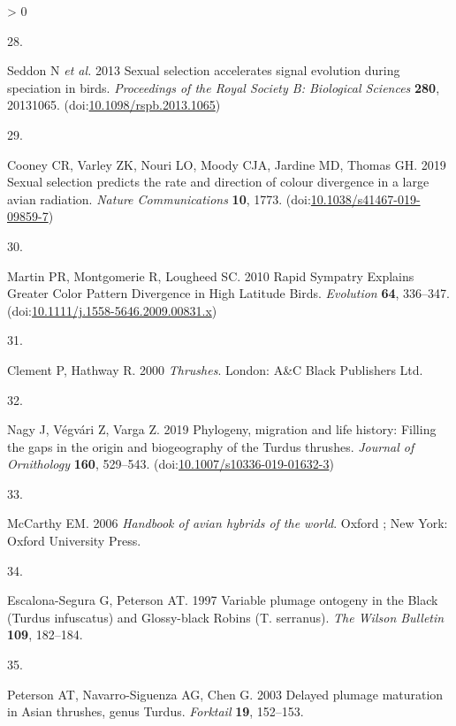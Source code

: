 \documentclass[
  a4paper,
]{article}
\newlength{\cslhangindent}
\newlength{\csllabelwidth}
\newenvironment{CSLReferences}[2] %
 {%
  \setlength{\parindent}{0pt}
  \ifodd #1 \everypar{\setlength{\hangindent}{\cslhangindent}}\ignorespaces\fi
  \ifnum #2 > 0
  \setlength{\parskip}{#2\baselineskip}
  \fi
 }%
 {}
\newcommand{\CSLLeftMargin}[1]{\parbox[t]{\csllabelwidth}{#1}}
\newcommand{\CSLRightInline}[1]{\parbox[t]{\linewidth - \csllabelwidth}{#1}\break}
\begin{document}
\begin{CSLReferences}{0}{0}
\leavevmode\hypertarget{ref-seddon2013}{}%
\CSLLeftMargin{28. }
\CSLRightInline{Seddon N \emph{et al.} 2013 Sexual selection accelerates
signal evolution during speciation in birds. \emph{Proceedings of the
Royal Society B: Biological Sciences} \textbf{280}, 20131065.
(doi:\href{https://doi.org/10.1098/rspb.2013.1065}{10.1098/rspb.2013.1065})}

\leavevmode\hypertarget{ref-cooney2019}{}%
\CSLLeftMargin{29. }
\CSLRightInline{Cooney CR, Varley ZK, Nouri LO, Moody CJA, Jardine MD,
Thomas GH. 2019 Sexual selection predicts the rate and direction of
colour divergence in a large avian radiation. \emph{Nature
Communications} \textbf{10}, 1773.
(doi:\href{https://doi.org/10.1038/s41467-019-09859-7}{10.1038/s41467-019-09859-7})}

\leavevmode\hypertarget{ref-martin2010}{}%
\CSLLeftMargin{30. }
\CSLRightInline{Martin PR, Montgomerie R, Lougheed SC. 2010 Rapid
{Sympatry Explains Greater Color Pattern Divergence} in {High Latitude
Birds}. \emph{Evolution} \textbf{64}, 336--347.
(doi:\href{https://doi.org/10.1111/j.1558-5646.2009.00831.x}{10.1111/j.1558-5646.2009.00831.x})}

\leavevmode\hypertarget{ref-clement2000}{}%
\CSLLeftMargin{31. }
\CSLRightInline{Clement P, Hathway R. 2000 \emph{Thrushes}. {London}:
{A\&C Black Publishers Ltd}. }

\leavevmode\hypertarget{ref-nagy2019}{}%
\CSLLeftMargin{32. }
\CSLRightInline{Nagy J, Végvári Z, Varga Z. 2019 Phylogeny, migration
and life history: Filling the gaps in the origin and biogeography of the
{Turdus} thrushes. \emph{Journal of Ornithology} \textbf{160}, 529--543.
(doi:\href{https://doi.org/10.1007/s10336-019-01632-3}{10.1007/s10336-019-01632-3})}

\leavevmode\hypertarget{ref-mccarthy2006}{}%
\CSLLeftMargin{33. }
\CSLRightInline{McCarthy EM. 2006 \emph{Handbook of avian hybrids of the
world}. {Oxford ; New York}: {Oxford University Press}. }

\leavevmode\hypertarget{ref-escalona-segura1997}{}%
\CSLLeftMargin{34. }
\CSLRightInline{Escalona-Segura G, Peterson AT. 1997 Variable plumage
ontogeny in the {Black} ({Turdus} infuscatus) and {Glossy}-black
{Robins} ({T}. serranus). \emph{The Wilson Bulletin} \textbf{109},
182--184.}

\leavevmode\hypertarget{ref-peterson2003}{}%
\CSLLeftMargin{35. }
\CSLRightInline{Peterson AT, Navarro-Siguenza AG, Chen G. 2003 Delayed
plumage maturation in {Asian} thrushes, genus {Turdus}. \emph{Forktail}
\textbf{19}, 152--153.}


\end{CSLReferences}
\end{document}
